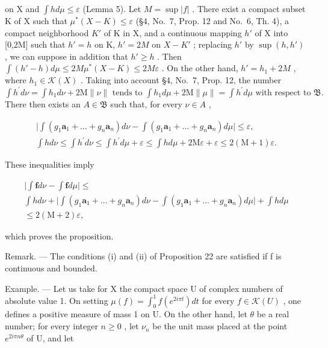 on X and \(\int h d\mu \leqslant \varepsilon\) (Lemma 5). Let \(M = \sup |f|\) . There exist a compact subset K of X such that \(\mu^{*}(X - K) \leqslant \varepsilon\) (§4, No.~7, Prop. 12 and No.~6, Th. 4), a compact neighborhood \(K'\) of K in X, and a continuous mapping \(h'\) of X into {[}0,2M{]} such that \(h' = h\) on K, \(h' = 2M\) on \(X - K'\) ; replacing \(h'\) by \(\sup(h, h')\) , we can suppose in addition that \(h' \geqslant h\) . Then \(\int(h' - h) d\mu \leqslant 2M\mu^{*}(X - K) \leqslant 2M\varepsilon\) . On the other hand, \(h' = h_1 + 2M\) , where \(h_1 \in \mathcal{K}(X)\) . Taking into account §4, No.~7, Prop. 12, the number \(\int h^{\prime}d\nu = \int h_{1}d\nu +2\mathrm{M}\| \nu \| \text{ tends to } \int h_{1}d\mu +2\mathrm{M}\| \mu \| = \int h^{\prime}d\mu \text{ with respect to } \mathfrak{B}.\) There then exists an \(A\in \mathfrak{B}\) such that, for every \(\nu \in A\) ,

\[
\begin{array}{c} \Big | \int (g _ {1} \mathbf {a} _ {1} + \dots + g _ {n} \mathbf {a} _ {n}) d \nu - \int (g _ {1} \mathbf {a} _ {1} + \dots + g _ {n} \mathbf {a} _ {n}) d \mu \Big | \leqslant \varepsilon , \\ \int h d \nu \leqslant \int h ^ {\prime} d \nu \leqslant \int h ^ {\prime} d \mu + \varepsilon \leqslant \int h d \mu + 2 \mathrm{M} \varepsilon + \varepsilon \leqslant 2 (\mathrm{M} + 1) \varepsilon . \end{array}
\]

These inequalities imply

\[
\begin{array}{c} \Big | \int \mathbf {f}   d \nu - \int \mathbf {f}   d \mu \Big | \leqslant \\ \int h   d \nu + \Big | \int (g _ {1} \mathbf {a} _ {1} + \dots + g _ {n} \mathbf {a} _ {n})   d \nu - \int (g _ {1} \mathbf {a} _ {1} + \dots + g _ {n} \mathbf {a} _ {n})   d \mu \Big | + \int h   d \mu \\ \leqslant 2 (\mathrm{M} + 2) \varepsilon , \end{array}
\]

which proves the proposition.

Remark. --- The conditions (i) and (ii) of Proposition 22 are satisfied if f is continuous and bounded.

Example. --- Let us take for X the compact space U of complex numbers of absolute value 1. On setting \(\mu(f) = \int_{0}^{1} f(e^{2i\pi t}) dt\) for every \(f \in \mathcal{K}(U)\) , one defines a positive measure of mass 1 on U. On the other hand, let \(\theta\) be a real number; for every integer \(n \geqslant 0\) , let \(\nu_{n}\) be the unit mass placed at the point \(e^{2i\pi n\theta}\) of U, and let

